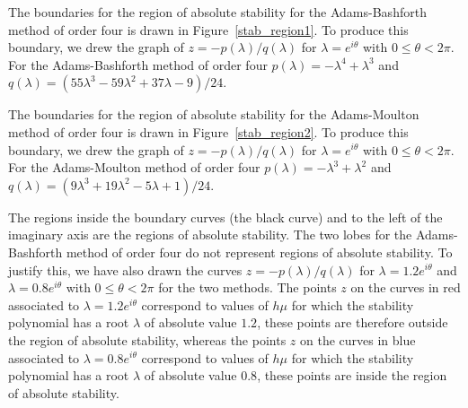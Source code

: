 
\begin{egg}
The boundaries for the region of absolute stability for the
Adams-Bashforth method of order four is drawn in
Figure~\ref{stab_region1}.
To produce this boundary, we drew the graph of
$z = - p(\lambda)/q(\lambda)$ for $\lambda = e^{i\theta}$ with
$0\leq \theta < 2\pi$.   For the Adams-Bashforth method
of order four $p(\lambda) = -\lambda^4 + \lambda^3$ and
$q(\lambda) = (55\lambda^3-59\lambda^2+37\lambda - 9)/24$.

The boundaries for the region of absolute stability for the
Adams-Moulton method of order four is drawn in
Figure~\ref{stab_region2}.  To produce this boundary, 
we drew the graph of $z = - p(\lambda)/q(\lambda)$ for
$\lambda = e^{i\theta}$ with $0\leq \theta < 2\pi$.
For the Adams-Moulton method of order four
$p(\lambda) = -\lambda^3 + \lambda^2$ and
$q(\lambda) = (9\lambda^3+19\lambda^2-5\lambda + 1)/24$.

The regions inside the boundary curves (the black curve) and to the
left of the imaginary axis are the regions of absolute stability.
The two lobes for the Adams-Bashforth method of order four do not
represent regions of absolute stability.  To justify this, we have
also drawn the curves $z = - p(\lambda)/q(\lambda)$ for
$\lambda = 1.2 e^{i\theta}$ and $\lambda = 0.8 e^{i\theta}$ with
$0\leq \theta < 2\pi$ for the two methods.  The points $z$ on the
curves in red associated to $\lambda = 1.2 e^{i\theta}$ correspond
to values of $h\mu$ for which the stability polynomial has a root
$\lambda$ of absolute value $1.2$, these points are therefore outside
the region of absolute stability, whereas the points $z$ on the curves
in blue associated to  $\lambda = 0.8 e^{i\theta}$ correspond to
values of $h\mu$ for which the stability polynomial has a root
$\lambda$ of absolute value $0.8$, these points are inside the region
of absolute stability.
\end{egg}


